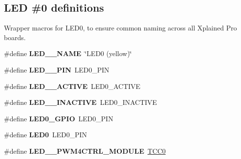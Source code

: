 \subsection*{L\+E\+D \#0 definitions}
\label{_amgrp08ca6a846f7c08111059f2a22cc48e51}%
Wrapper macros for L\+E\+D0, to ensure common naming across all Xplained Pro boards. \begin{DoxyCompactItemize}
\item 
\hypertarget{group__saml21__xplained__pro__features__group_ga2687b6cee21a30f8cf66f81c1c2431e4}{}\#define {\bfseries L\+E\+D\+\_\+\_\+\+N\+A\+M\+E}~\char`\"{}L\+E\+D0 (yellow)\char`\"{}\label{group__saml21__xplained__pro__features__group_ga2687b6cee21a30f8cf66f81c1c2431e4}

\item 
\hypertarget{group__saml21__xplained__pro__features__group_gad39bcbd30efbf4b9696783368266b2bb}{}\#define {\bfseries L\+E\+D\+\_\+\_\+\+P\+I\+N}~L\+E\+D0\+\_\+\+P\+I\+N\label{group__saml21__xplained__pro__features__group_gad39bcbd30efbf4b9696783368266b2bb}

\item 
\hypertarget{group__saml21__xplained__pro__features__group_ga88e5571eae6020697efb61d64d41fe3a}{}\#define {\bfseries L\+E\+D\+\_\+\_\+\+A\+C\+T\+I\+V\+E}~L\+E\+D0\+\_\+\+A\+C\+T\+I\+V\+E\label{group__saml21__xplained__pro__features__group_ga88e5571eae6020697efb61d64d41fe3a}

\item 
\hypertarget{group__saml21__xplained__pro__features__group_ga5e8d4c71949d6451097cb08d095e703a}{}\#define {\bfseries L\+E\+D\+\_\+\_\+\+I\+N\+A\+C\+T\+I\+V\+E}~L\+E\+D0\+\_\+\+I\+N\+A\+C\+T\+I\+V\+E\label{group__saml21__xplained__pro__features__group_ga5e8d4c71949d6451097cb08d095e703a}

\item 
\hypertarget{group__saml21__xplained__pro__features__group_gab6dc1ebd13b429afb03cfc49728cc896}{}\#define {\bfseries L\+E\+D0\+\_\+\+G\+P\+I\+O}~L\+E\+D0\+\_\+\+P\+I\+N\label{group__saml21__xplained__pro__features__group_gab6dc1ebd13b429afb03cfc49728cc896}

\item 
\hypertarget{group__saml21__xplained__pro__features__group_gae8d5b4e7e2d9d21caaa4744d385d7cc7}{}\#define {\bfseries L\+E\+D0}~L\+E\+D0\+\_\+\+P\+I\+N\label{group__saml21__xplained__pro__features__group_gae8d5b4e7e2d9d21caaa4744d385d7cc7}

\item 
\hypertarget{group__saml21__xplained__pro__features__group_ga2570f6c0e15c15039653fd46f951ae84}{}\#define {\bfseries L\+E\+D\+\_\+\_\+\+P\+W\+M4\+C\+T\+R\+L\+\_\+\+M\+O\+D\+U\+L\+E}~\hyperlink{group___s_a_m_l21_j18_a__base_ga99138b66570ac6a4b370ce5c3b52cd9f}{T\+C\+C0}\label{group__saml21__xplained__pro__features__group_ga2570f6c0e15c15039653fd46f951ae84}


\end{DoxyCompactItemize}
